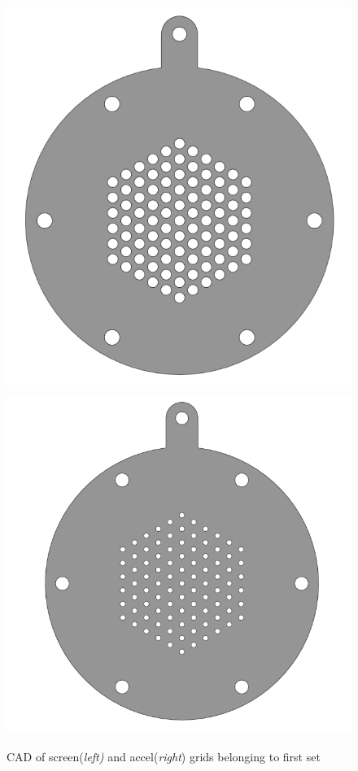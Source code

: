 \begin{figure}[ht]
    \centering
    \includegraphics[scale=.3]{fig/screen_6_cad.png}
    \includegraphics[scale=.3]{fig/accel_6_cad.png}
    \caption{CAD of screen(\textit{left)} and accel(\textit{right}) grids belonging to first set}
    \label{fig:cad_firstset}
\end{figure}

